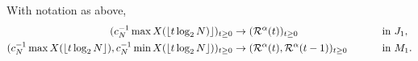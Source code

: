 \begin{theorem}
With notation as above, 
\begin{align*}
(c_N^{-1} \max X(\lfloor t \log_2 N)\rfloor)_{t \geq 0} &\rightarrow (\mathcal{R}^\alpha (t))_{t \geq 0} \qquad&&\text{ in } J_1, \\ 	
(c_N^{-1} \max X(\lfloor t \log_2 N\rfloor), c_N^{-1} \min X(\lfloor t \log_2 N\rfloor))_{t \geq 0} &\rightarrow (\mathcal{R}^\alpha (t), \mathcal{R}^\alpha (t - 1))_{t \geq 0} \qquad&&\text{ in } M_1. 
\end{align*}
\end{theorem}

\newpage